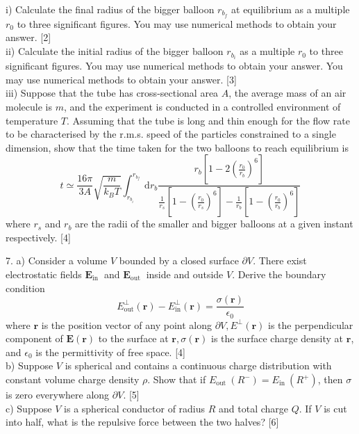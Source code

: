 \documentclass{article}
\begin{document}
i) Calculate the final radius of the bigger balloon $r_{b_{f}}$ at equilibrium as a multiple $r_{0}$ to three significant figures. You may use numerical methods to obtain your answer. [2] \\
ii) Calculate the initial radius of the bigger balloon $r_{b_{i}}$ as a multiple $r_{0}$ to three significant figures. You may use numerical methods to obtain your answer. You may use numerical methods to obtain your answer. [3] \\
iii) Suppose that the tube has cross-sectional area $A$, the average mass of an air molecule is $m$, and the experiment is conducted in a controlled environment of temperature $T$. Assuming that the tube is long and thin enough for the flow rate to be characterised by the r.m.s. speed of the particles constrained to a single dimension, show that the time taken for the two balloons to reach equilibrium is
$$
t \simeq \frac{16 \pi}{3 A} \sqrt{\frac{m}{k_{B} T}} \int_{r_{b_{i}}}^{r_{b_{f}}} \mathrm{~d} r_{b} \frac{r_{b}\left[1-2\left(\frac{r_{0}}{r_{b}}\right)^{6}\right]}{\frac{1}{r_{s}}\left[1-\left(\frac{r_{0}}{r_{s}}\right)^{6}\right]-\frac{1}{r_{b}}\left[1-\left(\frac{r_{0}}{r_{b}}\right)^{6}\right]}
$$
where $r_{s}$ and $r_{b}$ are the radii of the smaller and bigger balloons at a given instant respectively. [4]

7. a) Consider a volume $V$ bounded by a closed surface $\partial V$. There exist electrostatic fields $\mathbf{E}_{\text {in }}$ and $\mathbf{E}_{\text {out }}$ inside and outside $V$. Derive the boundary condition
$$
E_{\mathrm{out}}^{\perp}(\mathbf{r})-E_{\mathrm{in}}^{\perp}(\mathbf{r})=\frac{\sigma(\mathbf{r})}{\epsilon_{0}}
$$
where $\mathbf{r}$ is the position vector of any point along $\partial V, E^{\perp}(\mathbf{r})$ is the perpendicular component of $\mathbf{E}(\mathbf{r})$ to the surface at $\mathbf{r}, \sigma(\mathbf{r})$ is the surface charge density at $\mathbf{r}$, and $\epsilon_{0}$ is the permittivity of free space. [4] \\
b) Suppose $V$ is spherical and contains a continuous charge distribution with constant volume charge density $\rho$. Show that if $E_{\text {out }}\left(R^{-}\right)=E_{\text {in }}\left(R^{+}\right)$, then $\sigma$ is zero everywhere along $\partial V$. [5] \\
c) Suppose $V$ is a spherical conductor of radius $R$ and total charge $Q .$ If $V$ is cut into half, what is the repulsive force between the two halves? [6] 
\end{document}
